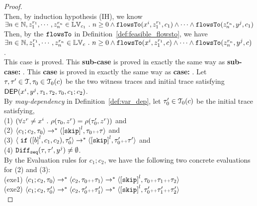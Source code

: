 \begin{proof}
\\
Then, by induction hypothesis (IH), we know 
\\
$\exists n \in \mathbb{N}, z_1^{r_1}, \cdots, z_n^{r_n} \in \mathbb{LV}_{{c_1}} ~.~ n \geq 0 \land
\mathtt{flowsTo}(x^i,  z_1^{r_1}, c_1) 
\land \cdots \land \mathtt{flowsTo}(z_n^{r_n}, y^j, c_1)$
\\
Then, by the $\mathtt{flowsTo}$ in Definition~\ref{def:feasible_flowsto}, we have 
\\
$\exists n \in \mathbb{N}, z_1^{r_1}, \cdots, z_n^{r_n} \in \mathbb{LV}_{{c}} ~.~ n \geq 0 \land
\mathtt{flowsTo}(x^i,  z_1^{r_1}, c) 
\land \cdots \land \mathtt{flowsTo}(z_n^{r_n}, y^j, c)$.
\\
This case is proved.
This \textbf{sub-case} is proved in exactly the same way as \textbf{sub-case: }.
  This \textbf{case} is proved in exactly the same way as \textbf{case: }.
  Let $\mathtt{\tau}, \mathtt{\tau}' \in \mathcal{T}, \mathtt{\tau}_0 \in \mathcal{T}_0(c)$ be the two witness traces and initial trace satisfying 
  $\mathsf{DEP}(x^i, y^j, \mathtt{\tau}_1, \mathtt{\tau}_2, \mathtt{\tau}_0, c_1; c_2)$.
  \\
  By \emph{may-dependency} in Definition~\ref{def:var_dep}, let $\mathtt{\tau}_0' \in \mathcal{T}_0(c)$ be the initial trace satisfying,
  \\
  (1) $ (\forall z^r \neq x^i ~.~   \rho(\mathtt{\tau}_0, z^r ) =   \rho(\mathtt{\tau}_0',z^r) )$
  and \\
  (2) $\config{c_1;c_2 , \trace_0} 
  \rightarrow^{*} \config{\clabel{\eskip}^l, \trace_0  \tracecat \trace } $ 
    and \\
  (3) $\config{\eif(\clabel{\bexpr}^{l} , {c_1}, {c_2}), \trace_0'} \rightarrow^{*} \config{\clabel{\eskip}^l, \trace_0'  \tracecat \trace'}$ 
    and \\
    (4) $\mathtt{Diff}_{\mathtt{seq}}(\mathtt{\tau}, \mathtt{\tau}', y^j ) \neq \emptyset$.
    \\
  By the Evaluation rules for $c_1;c_2$, we have the following two concrete evaluations for (2) and (3):
  \\
  (exe1) $\config{c_1;c_2 , \trace_0} 
  \rightarrow^{*} \config{c_2, \trace_0  \tracecat \trace_1}
  \rightarrow^{*} \config{\clabel{\eskip}^l, \trace_0  \tracecat \trace_1 \tracecat \trace_2 } $ \\
  (exe2) $\config{{c_1}; {c_2}, \trace_0'}
  \rightarrow^{*} \config{c_2, \trace_0'  \tracecat \trace_1'}
  \rightarrow^{*} \config{\clabel{\eskip}^l, \trace_0'  \tracecat \trace_1' \tracecat \trace_2'}$ 
  \\

\end{proof}
